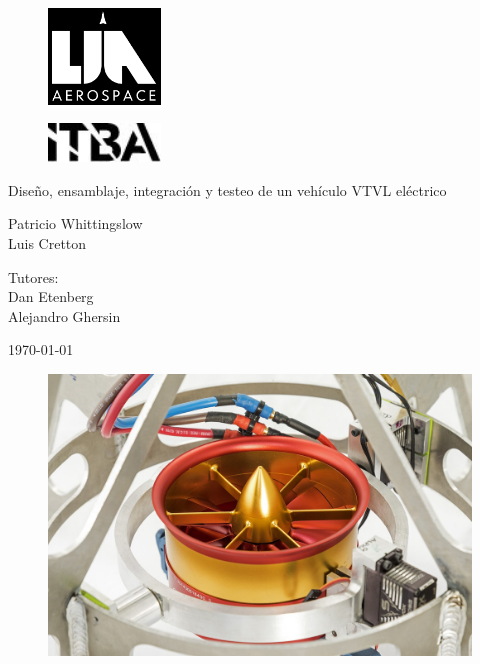 \documentclass[11pt, titlepage]{article}
\author{Patricio Whittingslow \and Luis Cretton}
\begin{document}
\begin{titlepage}
	
	\centering
	\vspace{-1cm}
	\begin{figure}[htb]
		\centering
		\includegraphics[width=3cm]{fig/lia-aerospace-logo.png}
	\end{figure}
	\begin{figure}[htb]
		\centering
		\includegraphics[width=3cm]{fig/itba-logo.jpg}
	\end{figure}
	
	\vspace{1cm}
	{\Huge Diseño, ensamblaje, integración y testeo de un vehículo VTVL eléctrico \par}
	\vspace{2cm}
	{ \large {
			Patricio Whittingslow \\ Luis Cretton 
		\par}}
	\vspace{.5cm}
	{ \large {
			Tutores:\\ Dan Etenberg \\ Alejandro Ghersin
		\par}}
	\vspace{1cm}
	\today
	\vspace{1cm}
	\begin{figure}[htb]
		\centering
		\includegraphics[width=\linewidth]{fig/hq/gimbal_close.jpg}
	\end{figure}
\end{titlepage}
\end{document}
